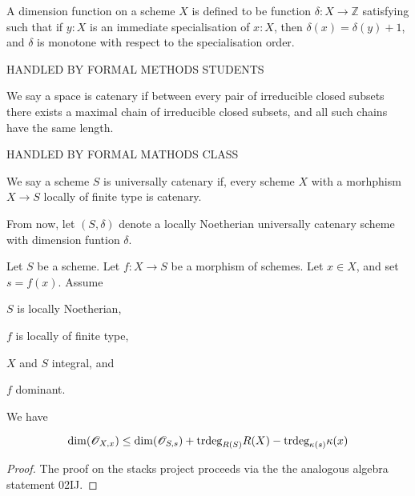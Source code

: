 %

\begin{definition}
  \label{def:dimfun}
  A dimension function on a scheme $X$ is defined to be function $\delta : X \rightarrow \mathbb{Z}$
  satisfying such that if $y : X$ is an immediate specialisation of $x : X$, then
  $\delta(x) = \delta(y) + 1$, and $\delta$ is monotone with respect to the
  specialisation order.

  HANDLED BY FORMAL METHODS STUDENTS
\end{definition}

\begin{definition}
  \label{def:catenary}
  We say a space is catenary if between every pair of irreducible closed subsets there
  exists a maximal chain of irreducible closed subsets, and all such chains have the
  same length.

  HANDLED BY FORMAL MATHODS CLASS
\end{definition}

\begin{definition}
  \label{02J7}
  We say a scheme $S$ is universally catenary if, every scheme $X$ with a morhphism
  $X \rightarrow S$ locally of finite type is catenary.
\end{definition}

From now, let $(S, \delta)$ denote a locally Noetherian universally catenary scheme
with dimension funtion $\delta$.

\begin{theorem}
  \label{thm:dimformula}
  
  Let $S$ be a scheme. Let $f:X \rightarrow S$ be a morphism of schemes. Let $x \in X$, and set $s=f(x)$. Assume

  $S$ is locally Noetherian,
  
  $f$ is locally of finite type,
  
  $X$ and $S$ integral, and
  
  $f$ dominant.
  
  We have

  \[
  \dim(\mathscr{O}_{X, x}) \leq \dim(\mathscr{O}_{S, s}) + \text{trdeg}_{R(S)} R(X) - \text{trdeg}_{\kappa(s)} \kappa(x)
  \]

\end{theorem}
\begin{proof}
The proof on the stacks project proceeds via the the analogous algebra statement 02IJ.
\end{proof}



